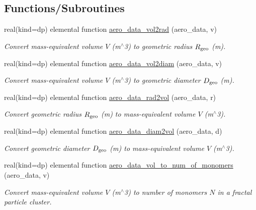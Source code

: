 \subsection*{Functions/\+Subroutines}
\begin{DoxyCompactItemize}
\item 
real(kind=dp) elemental function \mbox{\hyperlink{namespacepmc__aero__data_a807a9e4daf3a31625a1ddb3a179fb1e7}{aero\+\_\+data\+\_\+vol2rad}} (aero\+\_\+data, v)
\begin{DoxyCompactList}\small\item\em Convert mass-\/equivalent volume $V$ (m$^\wedge$3) to geometric radius $R_{\rm geo}$ (m). \end{DoxyCompactList}\item 
real(kind=dp) elemental function \mbox{\hyperlink{namespacepmc__aero__data_a02632f93bb71ae990e2a8196d3940f77}{aero\+\_\+data\+\_\+vol2diam}} (aero\+\_\+data, v)
\begin{DoxyCompactList}\small\item\em Convert mass-\/equivalent volume $V$ (m$^\wedge$3) to geometric diameter $D_{\rm geo}$ (m). \end{DoxyCompactList}\item 
real(kind=dp) elemental function \mbox{\hyperlink{namespacepmc__aero__data_a23092e214084d2b6ede337d0437c9358}{aero\+\_\+data\+\_\+rad2vol}} (aero\+\_\+data, r)
\begin{DoxyCompactList}\small\item\em Convert geometric radius $R_{\rm geo}$ (m) to mass-\/equivalent volume $V$ (m$^\wedge$3). \end{DoxyCompactList}\item 
real(kind=dp) elemental function \mbox{\hyperlink{namespacepmc__aero__data_a2e6484e2aeeb8aea7f9362d52ab7d32d}{aero\+\_\+data\+\_\+diam2vol}} (aero\+\_\+data, d)
\begin{DoxyCompactList}\small\item\em Convert geometric diameter $D_{\rm geo}$ (m) to mass-\/equivalent volume $V$ (m$^\wedge$3). \end{DoxyCompactList}\item 
real(kind=dp) elemental function \mbox{\hyperlink{namespacepmc__aero__data_a48a43b61e8f730503594919d154a04d0}{aero\+\_\+data\+\_\+vol\+\_\+to\+\_\+num\+\_\+of\+\_\+monomers}} (aero\+\_\+data, v)
\begin{DoxyCompactList}\small\item\em Convert mass-\/equivalent volume $V$ (m$^\wedge$3) to number of monomers $N$ in a fractal particle cluster. \end{DoxyCompactList}\item 

\end{DoxyCompactItemize}

